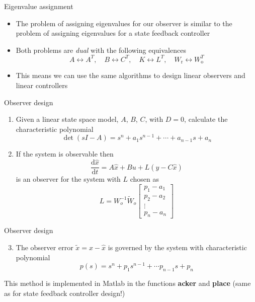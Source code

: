 \documentclass{beamer-control}
\begin{document}
\begin{frame}{Eigenvalue assignment}
\begin{itemize}
	\item The problem of assigning eigenvalues for our observer is similar to the problem of assigning eigenvalues for a state feedback controller 
	\item Both problems are \textit{dual} with the following equivalences
	\[A \leftrightarrow A^T, \quad B \leftrightarrow C^T, \quad K \leftrightarrow L^T, \quad W_{\mathrm{r}} \leftrightarrow W_{\mathrm{o}}^T \]
	\item This means we can use the same algorithms to design  linear observers and linear controllers
\end{itemize}
\end{frame}

\begin{frame}{Observer design}
	\begin{enumerate}
		\item Given a linear state space model, $A$, $B$, $C$, with $D=0$, calculate the characteristic polynomial
		\[\operatorname{det}(sI-A) = s^n+a_1s^{n-1}+\cdots + a_{n-1}s+a_n\]
		\item If the system is observable then 
		\[\frac{\mathrm{d}\hat{x}}{\mathrm{d}t} = A\hat{x}+Bu+L(y-C\hat{x})\]
		is an observer for the system with $L$ chosen as 
		\[L= W_o^{-1} \tilde{W}_o\begin{bmatrix}
			p_1-a_1\\ p_2-a_2 \\ \vdots \\ p_n-a_n
		\end{bmatrix}\]
		
	\end{enumerate}
\end{frame}

\begin{frame}{Observer design}
	\begin{enumerate}
		\setcounter{enumi}{2}
		\item The observer error $\tilde{x}=x-\hat{x}$ is governed by the system with characteristic polynomial 
		\[p(s) = s^n+p_1 s^{n-1}+ \cdots p_{n-1}s+p_n\]
	\end{enumerate}
	This method is implemented in Matlab in the functions \textbf{acker} and \textbf{place} (same as for state feedback controller design!)
\end{frame}




\end{document}
